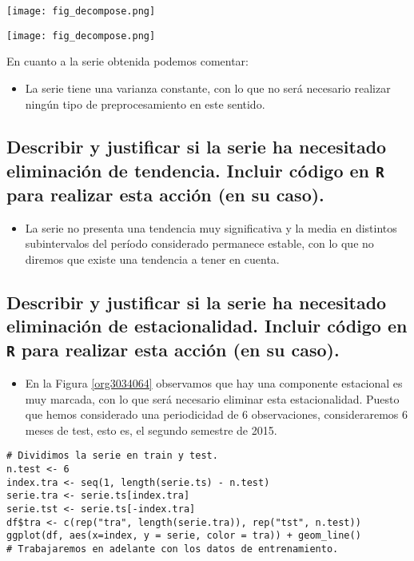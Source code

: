 \documentclass[11pt]{article}
\begin{document}
\begin{center}
\texttt{[image: fig\_decompose.png]}
\end{center}

\begin{center}
\texttt{[image: fig\_decompose.png]}
\end{center}

En cuanto a la serie obtenida podemos comentar: 
\begin{itemize}
\item La serie tiene una varianza constante, con lo que no será necesario
realizar ningún tipo de preprocesamiento en este sentido.
\end{itemize}


\subsection{Describir y justificar si la serie ha necesitado eliminación de tendencia. Incluir código en \texttt{R} para realizar esta acción (en su caso).}
\label{sec:orgd7d1c35}
\begin{itemize}
\item La serie no presenta una tendencia muy significativa y la media en
distintos subintervalos del período considerado permanece estable,
con lo que no diremos que existe una tendencia a tener en cuenta.
\end{itemize}


\subsection{Describir y justificar si la serie ha necesitado eliminación de estacionalidad. Incluir código en \texttt{R} para realizar esta acción (en su caso).}
\label{sec:org5649930}

\begin{itemize}
\item En la Figura \ref{org3034064} observamos que hay una componente
estacional es muy marcada, con lo que será necesario eliminar esta
estacionalidad. Puesto que hemos considerado una periodicidad de 6
observaciones, consideraremos 6 meses de test, esto es, el segundo
semestre de 2015.
\end{itemize}

\begin{verbatim}
# Dividimos la serie en train y test.
n.test <- 6
index.tra <- seq(1, length(serie.ts) - n.test)
serie.tra <- serie.ts[index.tra]
serie.tst <- serie.ts[-index.tra]
df$tra <- c(rep("tra", length(serie.tra)), rep("tst", n.test))
ggplot(df, aes(x=index, y = serie, color = tra)) + geom_line()
# Trabajaremos en adelante con los datos de entrenamiento.
\end{verbatim}
\end{document}
